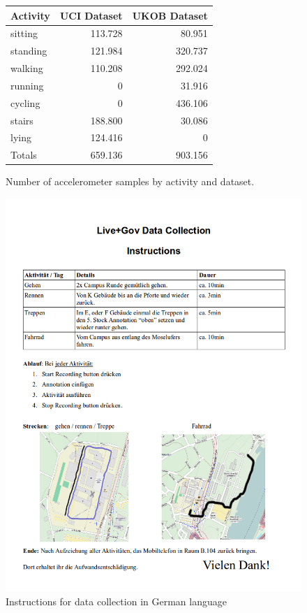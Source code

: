 \begin{figure}
\centering
\begin{tabular}{|l|r|r|} \hline
Activity  & UCI Dataset & UKOB Dataset \\ \hline
sitting   & 113.728     & 80.951        \\
standing  & 121.984     & 320.737       \\
walking   & 110.208     & 292.024       \\
running   & 0           & 31.916        \\
cycling   & 0           & 436.106       \\
stairs    & 188.800     & 30.086        \\
lying     & 124.416     & 0            \\ \hline \hline
Totals    & 659.136     & 903.156       \\ \hline
\end{tabular}

\caption{Number of accelerometer samples by activity and dataset.}
\label{fig:har_datasets}
\end{figure}

\begin{figure}[htbp]
  \centering
  \includegraphics[width=\textwidth]{img/har/data_collection_handout.png}
  \caption{Instructions for data collection in German
    language}\label{fig:data_collection_handout}
\end{figure}


%
%


